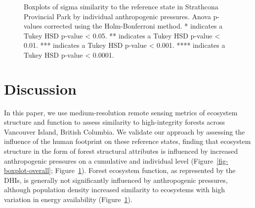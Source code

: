 \documentclass[
]{agujournal2019}
\begin{document}
\label{cell-fig-boxplot-individual}
\begin{figure}[H]


\caption{\label{fig-boxplot-individual}Boxplots of sigma similarity to
the reference state in Strathcona Provincial Park by individual
anthropogenic pressures. Anova p-values corrected using the
Holm-Bonferroni method. * indicates a Tukey HSD p-value \textless{}
0.05. ** indicates a Tukey HSD p-value \textless{} 0.01. *** indicates a
Tukey HSD p-value \textless{} 0.001. **** indicates a Tukey HSD p-value
\textless{} 0.0001.}

\end{figure}%

\section{Discussion}\label{discussion}

In this paper, we use medium-resolution remote sensing metrics of
ecosystem structure and function to assess similarity to high-integrity
forests across Vancouver Island, British Columbia. We validate our
approach by assessing the influence of the human footprint on these
reference states, finding that ecosystem structure in the form of forest
structural attributes is influenced by increased anthropogenic pressures
on a cumulative and individual level (Figure~\ref{fig-boxplot-overall};
Figure~\ref{fig-boxplot-individual}). Forest ecosystem function, as
represented by the DHIs, is generally not significantly influenced by
anthropogenic pressures, although population density increased
similarity to ecosystems with high variation in energy availability
(Figure~\ref{fig-boxplot-individual}).
\end{document}
